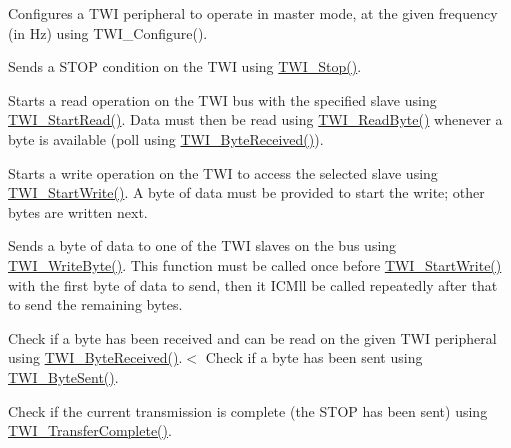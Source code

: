 \begin{DoxyItemize}
\item Configures a T\+WI peripheral to operate in master mode, at the given frequency (in Hz) using T\+W\+I\+\_\+\+Configure().  
\item Sends a S\+T\+OP condition on the T\+WI using \mbox{\hyperlink{arm_2atsam_2contrib_2libraries_2libchip_2source_2twi_8c_ab6f6a89c7dbb1075f904386273252977}{T\+W\+I\+\_\+\+Stop()}}. 
\item Starts a read operation on the T\+WI bus with the specified slave using \mbox{\hyperlink{arm_2atsam_2contrib_2libraries_2libchip_2source_2twi_8c_a806d1ace472ce5f4e2fe2de6f5a425ff}{T\+W\+I\+\_\+\+Start\+Read()}}. Data must then be read using \mbox{\hyperlink{arm_2atsam_2contrib_2libraries_2libchip_2source_2twi_8c_a8b4e96e6ce1126921517147b048fde51}{T\+W\+I\+\_\+\+Read\+Byte()}} whenever a byte is available (poll using \mbox{\hyperlink{arm_2atsam_2contrib_2libraries_2libchip_2source_2twi_8c_a2bb399b4984df2fdaabf741326636de2}{T\+W\+I\+\_\+\+Byte\+Received()}}). 
\item Starts a write operation on the T\+WI to access the selected slave using \mbox{\hyperlink{arm_2atsam_2contrib_2libraries_2libchip_2source_2twi_8c_a933fafb0a0d430f7feb10d01138b0466}{T\+W\+I\+\_\+\+Start\+Write()}}. A byte of data must be provided to start the write; other bytes are written next. 
\item Sends a byte of data to one of the T\+WI slaves on the bus using \mbox{\hyperlink{arm_2atsam_2contrib_2libraries_2libchip_2source_2twi_8c_ad728b448499f0b4d4633dfe0cc4a5ee7}{T\+W\+I\+\_\+\+Write\+Byte()}}. This function must be called once before \mbox{\hyperlink{arm_2atsam_2contrib_2libraries_2libchip_2source_2twi_8c_a933fafb0a0d430f7feb10d01138b0466}{T\+W\+I\+\_\+\+Start\+Write()}} with the first byte of data to send, then it I\+C\+Mll be called repeatedly after that to send the remaining bytes. 
\item Check if a byte has been received and can be read on the given T\+WI peripheral using \mbox{\hyperlink{arm_2atsam_2contrib_2libraries_2libchip_2source_2twi_8c_a2bb399b4984df2fdaabf741326636de2}{T\+W\+I\+\_\+\+Byte\+Received()}}.$<$ Check if a byte has been sent using \mbox{\hyperlink{arm_2atsam_2contrib_2libraries_2libchip_2source_2twi_8c_a908535df2873ebeaa63f6fda73ea6708}{T\+W\+I\+\_\+\+Byte\+Sent()}}. 
\item Check if the current transmission is complete (the S\+T\+OP has been sent) using \mbox{\hyperlink{arm_2atsam_2contrib_2libraries_2libchip_2source_2twi_8c_a8d8a0d10a7d128428c350f7337191fbd}{T\+W\+I\+\_\+\+Transfer\+Complete()}}. 

\end{DoxyItemize}

